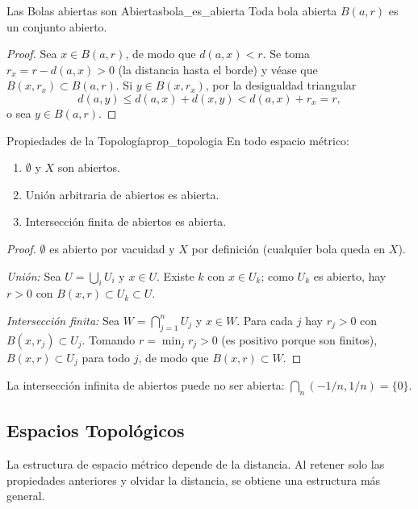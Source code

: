 \documentclass[11pt, a4paper]{article}
\begin{document}
\begin{proposicion}{Las Bolas abiertas son Abiertas}{bola_es_abierta}
Toda bola abierta $B(a, r)$ es un conjunto abierto.
\end{proposicion}

\begin{proof}
Sea $x \in B(a, r)$, de modo que $d(a, x) < r$. Se toma $r_x = r - d(a, x) > 0$ (la distancia hasta el
borde) y véase que $B(x, r_x) \subset B(a, r)$. Si $y \in B(x, r_x)$, por la desigualdad triangular
$$ d(a, y) \le d(a, x) + d(x, y) < d(a,x) + r_x = r, $$
o sea $y \in B(a, r)$.
\end{proof}

\begin{proposicion}{Propiedades de la Topología}{prop_topologia}
En todo espacio métrico:
\begin{enumerate}
    \item $\emptyset$ y $X$ son abiertos.
    \item Unión arbitraria de abiertos es abierta.
    \item Intersección finita de abiertos es abierta.
\end{enumerate}
\end{proposicion}

\begin{proof}
$\emptyset$ es abierto por vacuidad y $X$ por definición (cualquier bola queda en $X$).

\textit{Unión:} Sea $U = \bigcup_i U_i$ y $x \in U$. Existe $k$ con $x \in U_k$; como $U_k$ es
abierto, hay $r > 0$ con $B(x, r) \subset U_k \subset U$.

\textit{Intersección finita:} Sea $W = \bigcap_{j=1}^n U_j$ y $x \in W$. Para cada $j$ hay
$r_j > 0$ con $B(x, r_j) \subset U_j$. Tomando $r = \min_j r_j > 0$ (es positivo porque son
finitos), $B(x, r) \subset U_j$ para todo $j$, de modo que $B(x, r) \subset W$.
\end{proof}

\obs La intersección infinita de abiertos puede no ser abierta: $\bigcap_n (-1/n, 1/n) = \{0\}$.

\subsection{Espacios Topológicos}

La estructura de espacio métrico depende de la distancia. Al retener solo las propiedades
anteriores y olvidar la distancia, se obtiene una estructura más general.
\end{document}
